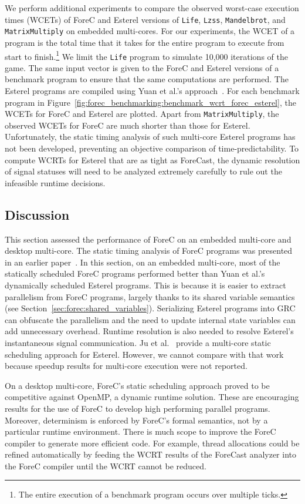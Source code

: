 We perform additional experiments to compare the 
observed worst-case execution times (WCETs) of ForeC and 
Esterel versions of \texttt{Life}, \texttt{Lzss}, \texttt{Mandelbrot},
and \texttt{MatrixMultiply} on embedded
multi-cores. For our experiments, the WCET of a program
is the total time that it takes for the entire program to 
execute from start to finish.\footnote{The entire execution 
of a benchmark program occurs over multiple ticks.} We limit the 
\texttt{Life} program to simulate 10,000 iterations of the game.
The same input vector is given to the ForeC and Esterel versions 
of a benchmark program to ensure that the same computations are performed. 
The Esterel programs are compiled using Yuan
et al.'s approach~\cite{Yuan13}. For each benchmark program in 
Figure~\ref{fig:forec_benchmarking:benchmark_wcrt_forec_esterel}, 
the WCETs for ForeC and 
Esterel are plotted. Apart from \texttt{MatrixMultiply}, the
observed WCETs for ForeC are much shorter than those for Esterel. 
Unfortunately, the static timing
analysis of such multi-core Esterel programs has not been developed, 
preventing an objective comparison of time-predictability. To 
compute WCRTs for Esterel that are as tight as ForeCast, 
the dynamic resolution of signal statuses will need to be analyzed 
extremely carefully to rule out the infeasible runtime decisions.


\subsection{Discussion}
This section assessed the performance 
of ForeC on an embedded multi-core and desktop multi-core. 
The static timing analysis of ForeC programs was presented in
an earlier paper~\cite{YipRAG13}. In this section, 
on an embedded multi-core, most of the statically 
scheduled ForeC programs performed better than Yuan et al.'s~\cite{Yuan13} 
dynamically scheduled Esterel programs. This is because it is easier
to extract parallelism from ForeC programs, largely thanks to its
shared variable semantics (see Section~\ref{sec:forec:shared_variables}). 
Serializing Esterel
programs into GRC can obfuscate the parallelism and the need
to update internal state variables can add unnecessary
overhead. Runtime resolution is also needed to resolve
Esterel's instantaneous signal communication. Ju et
al.~\cite{wcrt_esterel_multicores} provide a multi-core 
static scheduling approach for Esterel. However, we cannot 
compare with that work because speedup results 
for multi-core execution were not reported. 

On a desktop
multi-core, ForeC's static scheduling approach proved to be
competitive against OpenMP, a dynamic runtime solution.
These are encouraging results for the use of ForeC to
develop high performing parallel programs. Moreover, determinism is
enforced by ForeC's formal semantics, not by a particular
runtime environment. There is much scope to improve the
ForeC compiler to generate more efficient code. For example, thread
allocations could be refined automatically by feeding the 
WCRT results of the ForeCast analyzer into the ForeC compiler until 
the WCRT cannot be reduced. 
